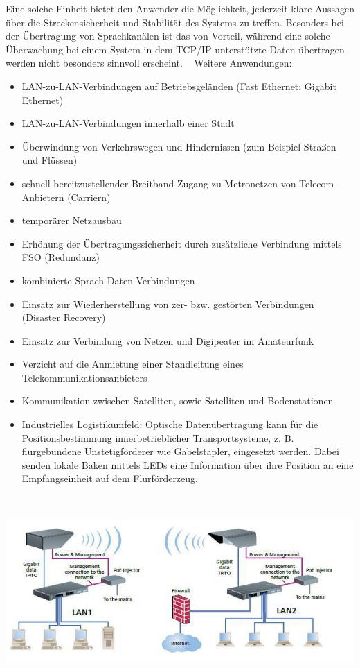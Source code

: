\begin{multicols}{3}
Eine solche Einheit bietet den Anwender die Möglichkeit, jederzeit klare Aussagen über die Streckensicherheit und Stabilität des Systems zu treffen. Besonders bei der Übertragung von Sprachkanälen ist das von Vorteil, während eine solche Überwachung bei einem System in dem TCP/IP unterstützte Daten übertragen werden nicht besonders sinnvoll erscheint. ~\cite{Laserlink.3}
Weitere Anwendungen:
\begin{itemize}
      \item LAN-zu-LAN-Verbindungen auf Betriebsgeländen (Fast Ethernet; Gigabit Ethernet)
      \item LAN-zu-LAN-Verbindungen innerhalb einer Stadt
      \item Überwindung von Verkehrswegen und Hindernissen (zum Beispiel Straßen und Flüssen)
      \item schnell bereitzustellender Breitband-Zugang zu Metronetzen von Telecom-Anbietern (Carriern)
      \item temporärer Netzausbau
      \item Erhöhung der Übertragungssicherheit durch zusätzliche Verbindung mittels FSO (Redundanz)
      \item kombinierte Sprach-Daten-Verbindungen
      \item Einsatz zur Wiederherstellung von zer- bzw. gestörten Verbindungen (Disaster Recovery)
      \item Einsatz zur Verbindung von Netzen und Digipeater im Amateurfunk
      \item Verzicht auf die Anmietung einer Standleitung eines Telekommunikationsanbieters
      \item Kommunikation zwischen Satelliten, sowie Satelliten und Bodenstationen
      \item Industrielles Logistikumfeld: Optische Datenübertragung kann für die Positionsbestimmung innerbetrieblicher Transportsysteme, z. B. flurgebundene Unstetigförderer wie Gabelstapler, eingesetzt werden. Dabei senden lokale Baken mittels LEDs eine Information über ihre Position an eine Empfangseinheit auf dem Flurförderzeug.
\end{itemize} ~\cite{Laserlink.4}
\begin{Figure}
\includegraphics[width=\linewidth]{Kapitel/Laserlink/Grafiken/Laserlink} 
\label{fig:vorlage.vorlesungssaal}
\end{Figure}


\end{multicols}
